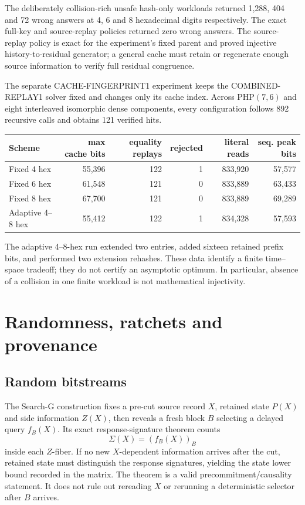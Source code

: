 \documentclass[11pt]{article}
\begin{document}
The deliberately collision-rich unsafe hash-only workloads returned 1,288,
404 and 72 wrong answers at 4, 6 and 8 hexadecimal digits respectively.  The
exact full-key and source-replay policies returned zero wrong answers.  The
source-replay policy is exact for the experiment's fixed parent and proved
injective history-to-residual generator; a general cache must retain or
regenerate enough source information to verify full residual congruence.

The separate CACHE-FINGERPRINT1 experiment keeps the COMBINED-REPLAY1 solver
fixed and changes only its cache index.  Across PHP$(7,6)$ and eight interleaved
isomorphic dense components, every configuration follows 892 recursive calls
and obtains 121 verified hits.

\begin{center}
\begin{tabular}{lrrrrr}
\toprule
Scheme & max cache bits & equality replays & rejected & literal reads & seq. peak bits\\
\midrule
Fixed 4 hex & 55,396 & 122 & 1 & 833,920 & 57,577\\
Fixed 6 hex & 61,548 & 121 & 0 & 833,889 & 63,433\\
Fixed 8 hex & 67,700 & 121 & 0 & 833,889 & 69,289\\
Adaptive 4--8 hex & 55,412 & 122 & 1 & 834,328 & 57,593\\
\bottomrule
\end{tabular}
\end{center}

The adaptive 4--8-hex run extended two entries, added sixteen retained prefix
bits, and performed two extension rehashes.  These data identify a finite
time--space tradeoff; they do not certify an asymptotic optimum.  In
particular, absence of a collision in one finite workload is not mathematical
injectivity.

\section{Randomness, ratchets and provenance}

\subsection{Random bitstreams}

The Search-G construction fixes a pre-cut source record $X$, retained state
$P(X)$ and side information $Z(X)$, then reveals a fresh block $B$ selecting a
delayed query $f_B(X)$.  Its exact response-signature theorem counts
\[
       \Sigma(X)=(f_B(X))_B
\]
inside each $Z$-fiber.  If no new $X$-dependent information arrives after the
cut, retained state must distinguish the response signatures, yielding the
state lower bound recorded in the matrix.  The theorem is a valid
precommitment/causality statement.  It does not rule out rereading $X$ or
rerunning a deterministic selector after $B$ arrives.
\end{document}
